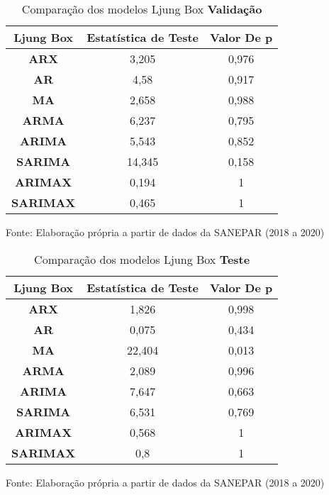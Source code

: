 \begin{table}[H]
	\centering
	\caption{Comparação dos modelos Ljung Box \textbf{Validação} }\label{tb:lbvld}
	\begin{tabular}{@{}ccc@{}}
		\toprule
		\textbf{Ljung Box} & \textbf{Estatística de Teste} & \textbf{Valor De p} \\ \midrule
		\textbf{ARX}       & 3,205                         & 0,976               \\
		\textbf{AR}        & 4,58                          & 0,917               \\
		\textbf{MA}        & 2,658                         & 0,988               \\
		\textbf{ARMA}      & 6,237                         & 0,795               \\
		\textbf{ARIMA}     & 5,543                         & 0,852               \\
		\textbf{SARIMA}    & 14,345                        & 0,158               \\
		\textbf{ARIMAX}    & 0,194                         & 1                   \\
		\textbf{SARIMAX}   & 0,465                         & 1                   \\ \bottomrule
	\end{tabular}

Fonte: Elaboração própria a partir de dados da SANEPAR (2018 a 2020)
\end{table}

\begin{table}[H]
	\centering
	\caption{Comparação dos modelos Ljung Box \textbf{Teste} }\label{tb:lbtst}
	\begin{tabular}{@{}ccc@{}}
		\toprule
		\textbf{Ljung Box} & \textbf{Estatística de Teste} & \textbf{Valor De p} \\ \midrule
		\textbf{ARX}       & 1,826                         & 0,998               \\
		\textbf{AR}        & 0,075                         & 0,434               \\
		\textbf{MA}        & 22,404                        & 0,013               \\
		\textbf{ARMA}      & 2,089                         & 0,996               \\
		\textbf{ARIMA}     & 7,647                         & 0,663               \\
		\textbf{SARIMA}    & 6,531                         & 0,769               \\
		\textbf{ARIMAX}    & 0,568                         & 1                   \\
		\textbf{SARIMAX}   & 0,8                           & 1                   \\ \bottomrule
	\end{tabular}
	
	Fonte: Elaboração própria a partir de dados da SANEPAR (2018 a 2020)
\end{table}

